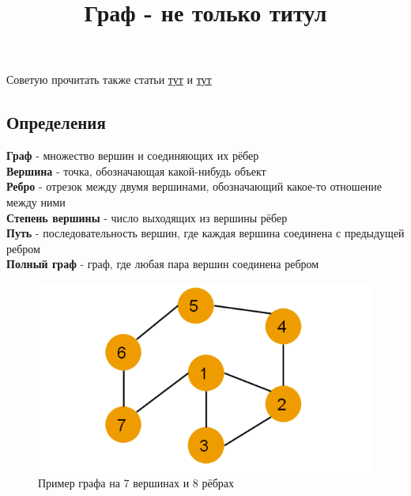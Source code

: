 \documentclass[a4paper,12pt]{article}
\title{Граф - не только титул}
\begin{document}
\maketitle
\subsection*{} Советую прочитать также статьи \href{https://kvant.mccme.ru/1994/06/grafy.htm}{тут} и \href{https://kvant.mccme.ru/1973/08/elementy_teorii_grafov.htm}{тут}

\subsection*{Определения}
\textbf{Граф} - множество вершин и соединяющих их рёбер \\
\textbf{Вершина} - точка, обозначающая какой-нибудь объект \\
\textbf{Ребро} - отрезок между двумя вершинами, обозначающий какое-то отношение между ними \\
\textbf{Степень вершины} - число выходящих из вершины рёбер \\
\textbf{Путь} - последовательность вершин, где каждая вершина соединена с предыдущей ребром\\
\textbf{Полный граф} - граф, где любая пара вершин соединена ребром\\
\begin{figure}[h]
    \centering
    \includegraphics[width=0.5\linewidth]{image.png}
    \caption{Пример графа на 7 вершинах и 8 рёбрах}
    \label{fig:graph} 
\end{figure}
\end{document}
